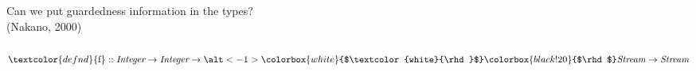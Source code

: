 \documentclass[xetex,serif,mathserif]{beamer}
\newenvironment{slide}[1]{\begin{frame}\frametitle{#1}}{\end{frame}}
\newcommand{\hlchange}[1]{\colorbox{black!20}{$#1$}}
\newcommand{\hlchangenull}[1]{\colorbox{white}{$#1$}}
\newcommand{\altdiffX}[3]{\alt<-#1>{\hlchangenull{\textcolor{white}{#3}}}{\hlchange{#3}}}
\newcommand{\tyname}[1]{\textit{#1}}
\newcommand{\defn}[1]{\textcolor{defnd}{\textrm{#1}}}
\begin{document}

\begin{frame}
  \begin{center}
    {Can we put guardedness information in the types?} \\
    \pause
    \textcolor{black!60}{(Nakano, 2000)}
  \end{center}
\end{frame}

\begin{slide}{}



  \begin{displaymath}
    \defn{f} :: \tyname{Integer} \to \tyname{Integer} \to \altdiffX{1}{}{\rhd}\tyname{Stream} \to \tyname{Stream}
  \end{displaymath}

  \pause


\end{slide}
\end{document}
